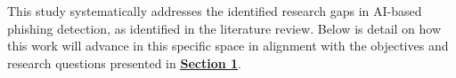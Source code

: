 
This study systematically addresses the identified research gaps in AI-based phishing detection, as identified in the literature review. Below is detail on how this work will advance in this specific space in alignment with the objectives and research questions presented in \hyperref[sec:1-introduction]{\uline{\textbf{Section 1}}}.

